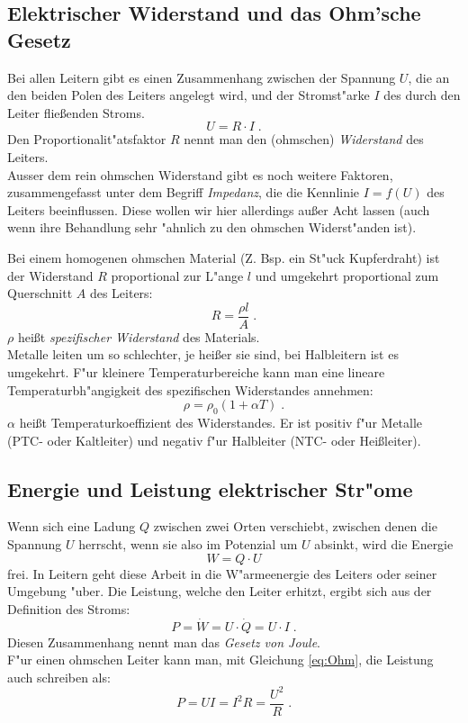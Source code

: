 \subsection{Elektrischer Widerstand und das Ohm'sche Gesetz}

Bei allen Leitern gibt es einen Zusammenhang zwischen der Spannung $U$, die an den beiden Polen des Leiters angelegt wird, und der Stromst"arke $I$ des durch den Leiter flie{\ss}enden Stroms.
\begin{equation}\label{eq:Ohm}
U = R\cdot I \; .
\end{equation}
Den Proportionalit"atsfaktor $R$ nennt man den (ohmschen) \textit{Widerstand} des Leiters. \\
Ausser dem rein ohmschen Widerstand gibt es noch weitere Faktoren, zusammengefasst unter dem Begriff \textit{Impedanz}, die die Kennlinie $I=f(U)$ des Leiters beeinflussen. Diese wollen wir hier allerdings au{\ss}er Acht lassen (auch wenn ihre Behandlung sehr "ahnlich zu den ohmschen Widerst"anden ist).

\noindent
Bei einem homogenen ohmschen Material (Z. Bsp. ein St"uck Kupferdraht) ist der Widerstand $R$ proportional zur L"ange $l$ und umgekehrt proportional zum Querschnitt $A$ des Leiters:
\begin{equation}
R = \frac{\rho l}{A} \; .
\end{equation}
$\rho$ hei{\ss}t \textit{spezifischer Widerstand} des Materials.\\
Metalle leiten um so schlechter, je hei{\ss}er sie sind, bei Halbleitern ist es umgekehrt. F"ur kleinere Temperaturbereiche kann man eine lineare Temperaturbh"angigkeit des spezifischen Widerstandes annehmen:
\begin{equation}
\rho = \rho_0(1+\alpha T)\; .
\end{equation}
$\alpha$ hei{\ss}t Temperaturkoeffizient des Widerstandes. Er ist positiv f"ur Metalle (PTC- oder Kaltleiter) und negativ f"ur Halbleiter (NTC- oder Hei{\ss}leiter).

\subsection{Energie und Leistung elektrischer Str"ome}

Wenn sich eine Ladung $Q$ zwischen zwei Orten verschiebt, zwischen denen die Spannung $U$ herrscht, wenn sie also im Potenzial um $U$ absinkt, wird die Energie
 \begin{equation}
  W = Q\cdot U
 \end{equation}
frei. In Leitern geht diese Arbeit in die W"armeenergie des Leiters oder seiner Umgebung "uber. Die Leistung, welche den Leiter erhitzt, ergibt sich aus der Definition des Stroms:
 \begin{equation} \label{eq:Joule}
  P = \dot{W} = U\cdot\dot{Q} = U\cdot I \; .
 \end{equation}
Diesen Zusammenhang nennt man das \textit{Gesetz von Joule}.\\
F"ur einen ohmschen Leiter kann man, mit Gleichung \ref{eq:Ohm}, die Leistung auch schreiben als:
 \begin{equation}
  P = UI = I^2 R= \frac{U^2}{R}\; .
 \end{equation}

